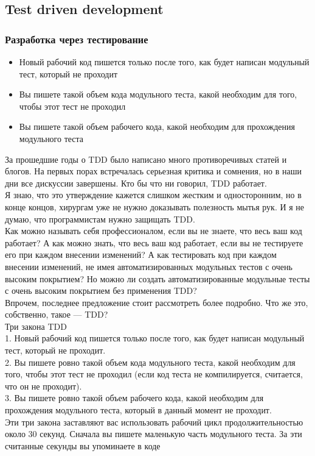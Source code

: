 \documentclass{../industrial-development}
\begin{document}
\subsection{Test driven development}
\begin{frame} \frametitle{Разработка через тестирование}
\begin{itemize}
  \item Новый рабочий код пишется только после того, как будет написан модульный тест, который не проходит
  \item Вы пишете такой объем кода модульного теста, какой необходим для того, чтобы этот тест не проходил
	\item Вы пишете такой объем рабочего кода, какой необходим для прохождения модульного теста
\end{itemize}
\end{frame}
\lecturenotes
За прошедшие годы о TDD было написано много противоречивых статей и блогов. На первых порах встречалась серьезная критика и сомнения, но в наши дни все дискуссии завершены. Кто бы что ни говорил, TDD работает.\\
Я знаю, что это утверждение кажется слишком жестким и односторонним, но в конце концов, хирургам уже не нужно доказывать полезность мытья рук. И я не думаю, что программистам нужно защищать TDD.\\
Как можно называть себя профессионалом, если вы не знаете, что весь ваш код работает? А как можно знать, что весь ваш код работает, если вы не тестируете его при каждом внесении изменений? А как тестировать код при каждом внесении изменений, не имея автоматизированных модульных тестов с очень высоким покрытием? Но можно ли создать автоматизированные модульные тесты с очень высоким покрытием без применения TDD?\\
Впрочем, последнее предложение стоит рассмотреть более подробно. Что же это, собственно, такое — TDD?\\
Три закона TDD\\
1. Новый рабочий код пишется только после того, как будет написан модульный тест, который не проходит.\\
2. Вы пишете ровно такой объем кода модульного теста, какой необходим для того, чтобы этот тест не проходил (если код теста не компилируется, считается, что он не проходит).\\
3. Вы пишете ровно такой объем рабочего кода, какой необходим для прохождения модульного теста, который в данный момент не проходит.\\
Эти три закона заставляют вас использовать рабочий цикл продолжительностью около 30 секунд. Сначала вы пишете маленькую часть модульного теста. За эти считанные секунды вы упоминаете в коде
\end{document}
